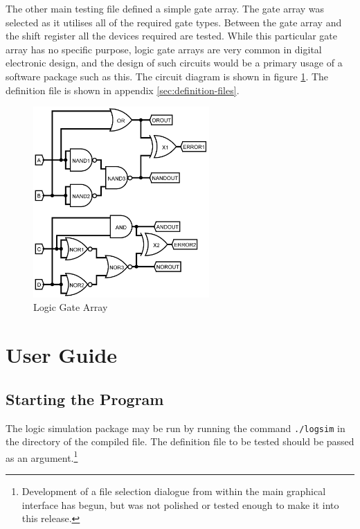 \documentclass[a4paper,10pt]{article}  %
\begin{document}
The other main testing file defined a simple gate array. The gate
array was selected as it utilises all of the required gate
types. Between the gate array and the shift register all the devices
required are tested. While this particular gate array has no specific
purpose, logic gate arrays are very common in digital electronic
design, and the design of such circuits would be a primary usage of a
software package such as this. The circuit diagram is shown in figure
\ref{fig:loggates}. The definition file is shown in appendix
\ref{sec:definition-files}.
\begin{figure}[htb]
  \begin{center}
    \includegraphics[width=0.6\textwidth]{testgates.png}
  \end{center}
  \caption{Logic Gate Array}
  \label{fig:loggates}
\end{figure}

\section{User Guide}
\label{sec:user-guide}

\subsection{Starting the Program}

The logic simulation package may be run by running the command
\texttt{./logsim} in the directory of the compiled file. The definition file to
be tested should be passed as an argument.\footnote{Development of a
  file selection dialogue from within the main graphical interface has
  begun, but was not polished or tested enough to make it into this
  release.} 
\end{document}
